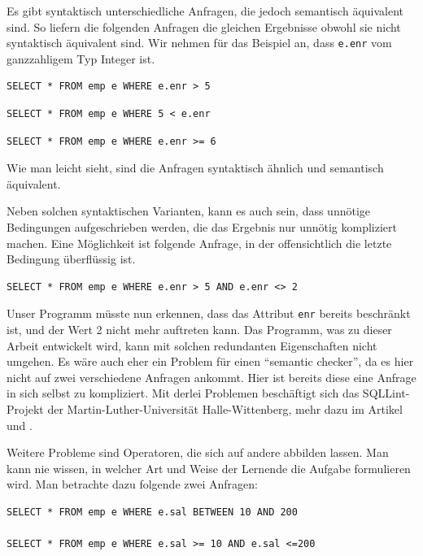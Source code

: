 Es gibt syntaktisch unterschiedliche Anfragen, die jedoch semantisch äquivalent sind. So liefern die folgenden Anfragen die gleichen Ergebnisse obwohl sie nicht syntaktisch äquivalent sind. Wir nehmen für das Beispiel an, dass \verb|e.enr| vom ganzzahligem Typ Integer ist.

\begin{verbatim}
SELECT * FROM emp e WHERE e.enr > 5
\end{verbatim}

\begin{verbatim}
SELECT * FROM emp e WHERE 5 < e.enr
\end{verbatim}

\begin{verbatim}
SELECT * FROM emp e WHERE e.enr >= 6
\end{verbatim}

Wie man leicht sieht, sind die Anfragen syntaktisch ähnlich und semantisch äquivalent. 

Neben solchen syntaktischen Varianten, kann es auch sein, dass unnötige Bedingungen aufgeschrieben werden, die das Ergebnis nur unnötig kompliziert machen. Eine Möglichkeit ist folgende Anfrage, in der offensichtlich die letzte Bedingung überflüssig ist.
\begin{verbatim}
SELECT * FROM emp e WHERE e.enr > 5 AND e.enr <> 2
\end{verbatim}

Unser Programm müsste nun erkennen, dass das Attribut \verb|enr| bereits beschränkt ist, und der Wert 2 nicht mehr auftreten kann. Das Programm, was zu dieser Arbeit entwickelt wird, kann mit solchen redundanten Eigenschaften nicht umgehen. Es wäre auch eher ein Problem für einen ``semantic checker'', da es hier nicht auf zwei verschiedene Anfragen ankommt. Hier ist bereits diese eine Anfrage in sich selbst zu kompliziert. Mit derlei Problemen beschäftigt sich das SQLLint-Projekt der Martin-Luther-Universität Halle-Wittenberg, mehr dazu im Artikel \cite{brass1} und \cite{brass2}.

Weitere Probleme sind Operatoren, die sich auf andere abbilden lassen. Man kann nie wissen, in welcher Art und Weise der Lernende die Aufgabe formulieren wird. Man betrachte dazu folgende zwei Anfragen:
\begin{verbatim}
SELECT * FROM emp e WHERE e.sal BETWEEN 10 AND 200

SELECT * FROM emp e WHERE e.sal >= 10 AND e.sal <=200
\end{verbatim}

